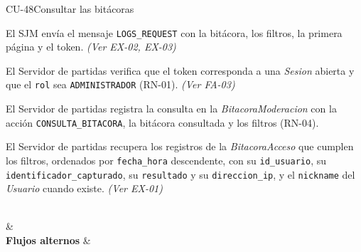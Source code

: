 \begin{fichacu}{CU-48}{Consultar las bitácoras}
{\begin{cuenum}[start=1]
      \item El SJM envía el mensaje \texttt{LOGS\_\allowbreak{}REQUEST} con la bitácora, los filtros, la primera página y el token. \textit{(Ver \mbox{EX-02}, \mbox{EX-03})}
      \item El Servidor de partidas verifica que el token corresponda a una \textit{Sesion} abierta y que el \texttt{rol} sea \texttt{ADMINISTRADOR} (\mbox{RN-01}). \textit{(Ver \mbox{FA-03})}
      \item El Servidor de partidas registra la consulta en la \textit{BitacoraModeracion} con la acción \texttt{CONSULTA\_\allowbreak{}BITACORA}, la bitácora consultada y los filtros (\mbox{RN-04}).
      \item El Servidor de partidas recupera los registros de la \textit{BitacoraAcceso} que cumplen los filtros, ordenados por \texttt{fecha\_\allowbreak{}hora} descendente, con su \texttt{id\_\allowbreak{}usuario}, su \texttt{identificador\_\allowbreak{}capturado}, su \texttt{resultado} y su \texttt{direccion\_\allowbreak{}ip}, y el \texttt{nickname} del \textit{Usuario} cuando existe. \textit{(Ver \mbox{EX-01})}
    \end{cuenum}} \\
   &  \\ \hline
  \textbf{Flujos alternos} & 
\end{fichacu}
